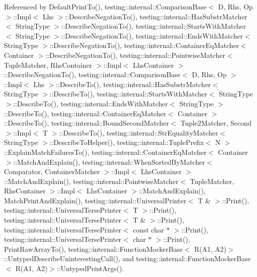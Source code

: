 Referenced by Default\+Print\+To(), testing\+::internal\+::\+Comparison\+Base$<$ D, Rhs, Op $>$\+::\+Impl$<$ Lhs $>$\+::\+Describe\+Negation\+To(), testing\+::internal\+::\+Has\+Substr\+Matcher$<$ String\+Type $>$\+::\+Describe\+Negation\+To(), testing\+::internal\+::\+Starts\+With\+Matcher$<$ String\+Type $>$\+::\+Describe\+Negation\+To(), testing\+::internal\+::\+Ends\+With\+Matcher$<$ String\+Type $>$\+::\+Describe\+Negation\+To(), testing\+::internal\+::\+Container\+Eq\+Matcher$<$ Container $>$\+::\+Describe\+Negation\+To(), testing\+::internal\+::\+Pointwise\+Matcher$<$ Tuple\+Matcher, Rhs\+Container $>$\+::\+Impl$<$ Lhs\+Container $>$\+::\+Describe\+Negation\+To(), testing\+::internal\+::\+Comparison\+Base$<$ D, Rhs, Op $>$\+::\+Impl$<$ Lhs $>$\+::\+Describe\+To(), testing\+::internal\+::\+Has\+Substr\+Matcher$<$ String\+Type $>$\+::\+Describe\+To(), testing\+::internal\+::\+Starts\+With\+Matcher$<$ String\+Type $>$\+::\+Describe\+To(), testing\+::internal\+::\+Ends\+With\+Matcher$<$ String\+Type $>$\+::\+Describe\+To(), testing\+::internal\+::\+Container\+Eq\+Matcher$<$ Container $>$\+::\+Describe\+To(), testing\+::internal\+::\+Bound\+Second\+Matcher$<$ Tuple2\+Matcher, Second $>$\+::\+Impl$<$ T $>$\+::\+Describe\+To(), testing\+::internal\+::\+Str\+Equality\+Matcher$<$ String\+Type $>$\+::\+Describe\+To\+Helper(), testing\+::internal\+::\+Tuple\+Prefix$<$ N $>$\+::\+Explain\+Match\+Failures\+To(), testing\+::internal\+::\+Container\+Eq\+Matcher$<$ Container $>$\+::\+Match\+And\+Explain(), testing\+::internal\+::\+When\+Sorted\+By\+Matcher$<$ Comparator, Container\+Matcher $>$\+::\+Impl$<$ Lhs\+Container $>$\+::\+Match\+And\+Explain(), testing\+::internal\+::\+Pointwise\+Matcher$<$ Tuple\+Matcher, Rhs\+Container $>$\+::\+Impl$<$ Lhs\+Container $>$\+::\+Match\+And\+Explain(), Match\+Print\+And\+Explain(), testing\+::internal\+::\+Universal\+Printer$<$ T \& $>$\+::\+Print(), testing\+::internal\+::\+Universal\+Terse\+Printer$<$ T $>$\+::\+Print(), testing\+::internal\+::\+Universal\+Terse\+Printer$<$ T \& $>$\+::\+Print(), testing\+::internal\+::\+Universal\+Terse\+Printer$<$ const char $\ast$ $>$\+::\+Print(), testing\+::internal\+::\+Universal\+Terse\+Printer$<$ char $\ast$ $>$\+::\+Print(), Print\+Raw\+Array\+To(), testing\+::internal\+::\+Function\+Mocker\+Base$<$ R(\+A1, A2)$>$\+::\+Untyped\+Describe\+Uninteresting\+Call(), and testing\+::internal\+::\+Function\+Mocker\+Base$<$ R(\+A1, A2)$>$\+::\+Untyped\+Print\+Args().


